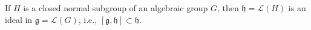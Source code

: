 If $H$ is a closed normal subgroup of an algebraic group $G$, then $\mathfrak{h} = \mathcal{L}(H)$ is an ideal in $\mathfrak{g} = \mathcal{L}(G)$, i.e., $[\mathfrak{g}, \mathfrak{h}] \subset \mathfrak{h}$.
